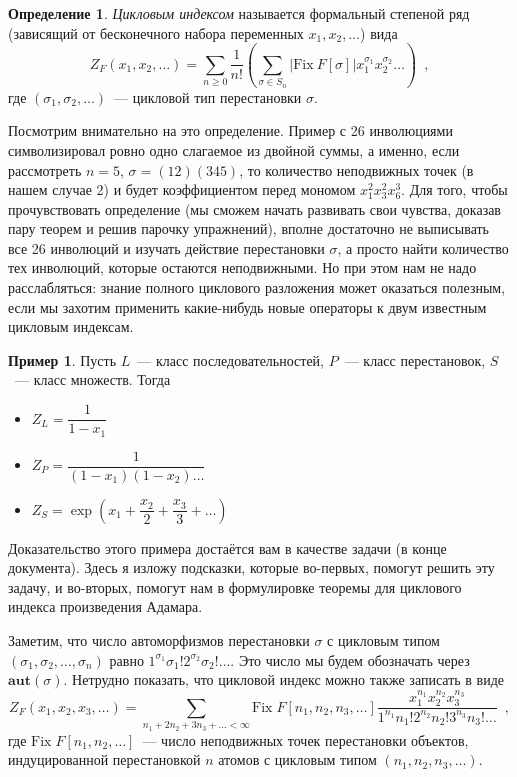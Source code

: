 \documentclass{article}
\theoremstyle{definition}
\newtheorem{example}{Пример}
\newtheorem*{definition}{Определение}
\begin{document}
\begin{definition}
	\textit{Цикловым индексом} называется формальный степеной ряд (зависящий от 
	бесконечного набора переменных \( x_1, x_2, \ldots \)) вида
	\[
		Z_F(x_1, x_2, \ldots) = \sum_{n \geq 0} \dfrac{1}{n!} \left(
			\sum_{\sigma \in S_n} |\mathrm{Fix}\ F[\sigma]|x_1^{\sigma_1} 
			x_2^{\sigma_2} \ldots
		\right) \enspace ,
	\]
	где \( (\sigma_1, \sigma_2, \ldots) \)~--- цикловой тип перестановки \( 
	\sigma \).
\end{definition}

Посмотрим внимательно на это определение. Пример с 26 инволюциями символизировал
ровно одно слагаемое из двойной суммы, а именно, если рассмотреть \( n = 5 \),
\( \sigma = (12)(345) \), то количество неподвижных точек (в нашем случае 2) и
будет коэффициентом перед мономом \( x_1^2 x_3^2 x_6^3 \). Для того, чтобы
прочувствовать определение (мы сможем начать развивать свои чувства, доказав
пару теорем и решив парочку упражнений), вполне достаточно не выписывать все 26
инволюций и изучать действие перестановки \( \sigma \),  а просто найти
количество тех инволюций, которые остаются неподвижными. Но при этом нам не надо
расслабляться: знание полного циклового разложения может оказаться полезным,
если мы захотим применить какие-нибудь новые операторы к двум известным цикловым
индексам.

\begin{example}
	Пусть \( L \)~--- класс последовательностей, \( P \)~--- класс 
	перестановок, \( S \)~--- класс множеств. Тогда
	\begin{itemize}
		\item	\( Z_L = \dfrac{1}{1 - x_1} \)
		\item 	\( Z_P = \dfrac{1}{(1-x_1)(1-x_2)\ldots} \)
		\item   \( Z_S = \exp \left(
			x_1 + \dfrac{x_2}{2} + \dfrac{x_3}{3} + \ldots
		\right) \)
	\end{itemize}
\end{example}

Доказательство этого примера достаётся вам в качестве задачи (в конце
документа). Здесь я изложу подсказки, которые во-первых, помогут решить эту
задачу, и во-вторых, помогут нам в формулировке теоремы для циклового индекса
произведения Адамара.

Заметим, что число автоморфизмов перестановки \( \sigma \) с цикловым типом \(
(\sigma_1, \sigma_2, \ldots, \sigma_n) \) равно \( 1^{\sigma_1}
\sigma_1! 2^{\sigma_2} \sigma_2! \ldots \). Это число мы будем обозначать через
\( \mathbf{aut}(\sigma) \). Нетрудно показать, что цикловой индекс можно также
записать в виде
\[
    Z_F(x_1, x_2, x_3, \ldots) = \sum_{n_1 + 2n_2 + 3n_3 + \ldots < \infty}
\mathrm{Fix}\; F[n_1, n_2, n_3, \ldots] \dfrac{x_1^{n_1} x_2^{n_2}
x_3^{n_3}}{1^{n_1} n_1! 2^{n_2} n_2! 3^{n_3} n_3! \ldots} \enspace ,
\]
где \( \mathrm{Fix}\; F[n_1, n_2, \ldots] \)~--- число неподвижных точек
перестановки объектов, индуцированной перестановкой \( n \) атомов с цикловым типом \(
(n_1, n_2, n_3, \ldots ) \).
\end{document}
